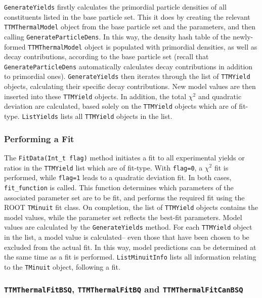 \documentclass{elsarticle}
\begin{document}
\texttt{GenerateYields} firstly calculates the 
primordial particle densities of all constituents listed in the base particle set. This it 
does by creating the relevant \texttt{TTMThermalModel} object from the base particle set and the parameters, and then calling 
\texttt{GenerateParticleDens}. In this way, the density hash table of the newly-formed \texttt{TTMThermalModel} object is 
populated with primordial densities, as well as decay contributions, according to the base particle set (recall that 
\texttt{GenerateParticleDens} automatically calculates decay contributions in addition to primordial ones). 
\texttt{GenerateYields} then iterates 
through the list of \texttt{TTMYield} objects, calculating their specific decay contributions. New model values are then inserted into these \texttt{TTMYield} objects. In addition, the total 
$\chi^2$ and quadratic deviation are calculated, based solely on the \texttt{TTMYield} objects 
which are of fit-type. \texttt{ListYields} lists all \texttt{TTMYield} objects in the list.\\

\subsubsection{Performing a Fit}

The \texttt{FitData(Int\_t flag)} method initiates a fit to all experimental yields or ratios in the \texttt{TTMYield} list which are of fit-type. With \texttt{flag=0}, a $\chi^2$ fit is performed, while \texttt{flag=1} leads 
to a quadratic deviation fit. In both cases, \texttt{fit\_function} is called. This function determines which parameters of the associated parameter set 
are to be fit, and performs the required fit using the ROOT \texttt{TMinuit} fit class. On completion, the list of \texttt{TTMYield} objects contains the model values, while the parameter set reflects the best-fit parameters. Model values are calculated by the 
\texttt{GenerateYields} method. For each \texttt{TTMYield} object in the list, a model value is calculated-- even those that have been chosen to be excluded from the actual fit. In this way, model 
predictions can be determined at the same time as a fit is performed. \texttt{ListMinuitInfo} lists 
all information relating to the \texttt{TMinuit} object, following a fit. 

\subsubsection{\texttt{TTMThermalFitBSQ}, \texttt{TTMThermalFitBQ} and \texttt{TTMThermalFitCanBSQ}}
\end{document}
